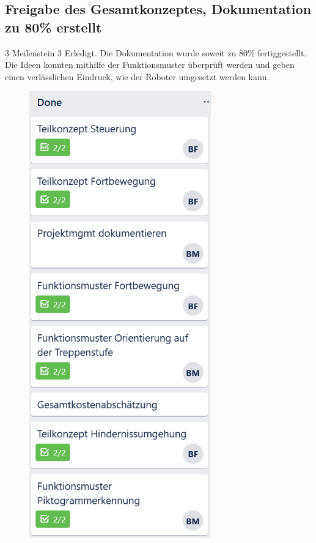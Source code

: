     
\subsection*{Freigabe des Gesamtkonzeptes, Dokumentation zu 80\% erstellt}
\workday
    {3}
    {\ok Meilenstein 3 Erledigt.}
    {
      Die Dokumentation wurde soweit zu 80\% fertiggestellt. 
    }
    {
      Die Ideen konnten mithilfe der Funktionsmuster überprüft werden und geben einen verlässlichen Eindruck, wie der Roboter umgesetzt werden kann.
    }

    
    
        \begin{figure}[H]
  \centering
  \begin{minipage}[t]{0.45\linewidth}
  \includegraphics[width=0.7\textwidth]{img/Trello/Trello-Bord_3_Nr1.PNG}

\end{minipage}
\end{figure}

